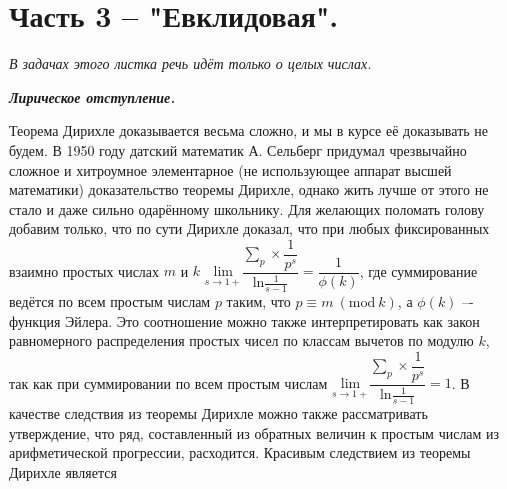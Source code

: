 
\section{Часть 3 -- "Евклидовая".}

\begin{center}
    \footnotesize{\textit{В задачах этого листка речь идёт только о целых числах.}}
\end{center}

\begin{center}
    \textit{\textbf{Лирическое отступление.}}
\end{center}

\begin{center}
\end{center}

Теорема Дирихле доказывается весьма сложно, и мы  в курсе её доказывать не будем. В 1950 году датский математик А. Сельберг придумал чрезвычайно сложное и хитроумное элементарное (не использующее аппарат высшей математики) доказательство теоремы Дирихле, однако жить лучше от этого не стало и даже сильно одарённому школьнику. Для желающих поломать голову добавим только, что по сути Дирихле доказал, что при любых фиксированных взаимно простых числах $m$ и $k$ $\underset{s \rightarrow 1+}{\textrm{lim}} \dfrac{ \underset{p}{\sum} \times \dfrac{1}{p^s}}{\textrm{ln} \frac{1}{s - 1}} = \dfrac{1}{\phi(k)}$, где суммирование ведётся по всем простым числам $p$ таким, что $p \equiv m~(\textrm{mod}~k)$, а $\phi (k)$ –- функция Эйлера. Это соотношение можно также интерпретировать как закон равномерного распределения простых чисел по классам вычетов по модулю $k$, так как при суммировании по всем простым числам $\underset{s \rightarrow 1+}{\textrm{lim}} \dfrac{ \underset{p}{\sum} \times \dfrac{1}{p^s}}{\textrm{ln} \frac{1}{s - 1}} = 1$. В качестве следствия из теоремы Дирихле можно также рассматривать утверждение, что ряд, составленный из обратных величин к простым числам из арифметической прогрессии, расходится. Красивым следствием из теоремы Дирихле является

